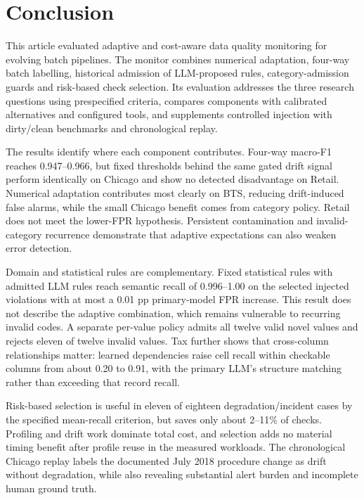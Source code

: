 \section{Conclusion}
\label{sec:conclusion}

This article evaluated adaptive and cost-aware data quality monitoring for evolving batch pipelines. The monitor combines numerical adaptation, four-way batch labelling, historical admission of LLM-proposed rules, category-admission guards and risk-based check selection. Its evaluation addresses the three research questions using prespecified criteria, compares components with calibrated alternatives and configured tools, and supplements controlled injection with dirty/clean benchmarks and chronological replay.

The results identify where each component contributes. Four-way macro-F1 reaches 0.947--0.966, but fixed thresholds behind the same gated drift signal perform identically on Chicago and show no detected disadvantage on Retail. Numerical adaptation contributes most clearly on BTS, reducing drift-induced false alarms, while the small Chicago benefit comes from category policy. Retail does not meet the lower-FPR hypothesis. Persistent contamination and invalid-category recurrence demonstrate that adaptive expectations can also weaken error detection.

Domain and statistical rules are complementary. Fixed statistical rules with admitted LLM rules reach semantic recall of 0.996--1.00 on the selected injected violations with at most a 0.01 pp primary-model FPR increase. This result does not describe the adaptive combination, which remains vulnerable to recurring invalid codes. A separate per-value policy admits all twelve valid novel values and rejects eleven of twelve invalid values. Tax further shows that cross-column relationships matter: learned dependencies raise cell recall within checkable columns from about 0.20 to 0.91, with the primary LLM's structure matching rather than exceeding that record recall.

Risk-based selection is useful in eleven of eighteen degradation/incident cases by the specified mean-recall criterion, but saves only about 2--11\% of checks. Profiling and drift work dominate total cost, and selection adds no material timing benefit after profile reuse in the measured workloads. The chronological Chicago replay labels the documented July 2018 procedure change as drift without degradation, while also revealing substantial alert burden and incomplete human ground truth.

